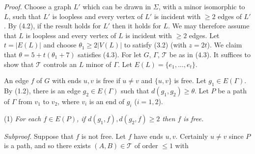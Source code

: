 \textit{Proof.} Choose a graph $L'$ which can be drawn in $\Sigma$, with a minor isomorphic to $L$, such that $L'$ is loopless and every vertex of $L'$ is incident with $\ge 2$ edges of $L'$. By (4.2), if the result holds for $L'$ then it holds for $L$. We may therefore assume that $L$ is loopless and every vertex of $L$ is incident with $\ge 2$ edges. Let $t = |E(L)|$ and choose $\theta_1 \ge 2 |V(L)|$ to satisfy (3.2) (with $z = 2t$). We claim that $\theta = 5 + t(\theta_1 + 7)$ satisfies (4.3). For let $G$, $\Gamma$, $\mathscr{T}$ be as in (4.3). It suffices to show that $\mathscr{T}$ controls an $L$ minor of $\Gamma$. Let $E(L) = \{e_1, \dots, e_t\}$.

An edge $f$ of $G$ with ends $u, v$ is free if $u \ne v$ and $\{u, v\}$ is free. Let $g_1 \in E(\Gamma)$. By (1.2), there is an edge $g_2 \in E(\Gamma)$ such that $d(g_1, g_2) \ge \theta$. Let $P$ be a path of $\Gamma$ from $v_1$ to $v_2$, where $v_i$ is an end of $g_i$ ($i = 1, 2$).

\hspace*{12pt}(1) \textit{For each $f \in E(P)$, if $d(g_1, f), d(g_2, f) \ge 2$ then $f$ is free.}

\textit{Subproof.} Suppose that $f$ is not free. Let $f$ have ends $u, v$. Certainly $u \ne v$ since $P$ is a path, and so there exists $(A, B) \in \mathscr{T}$ of order $\le 1$ with
